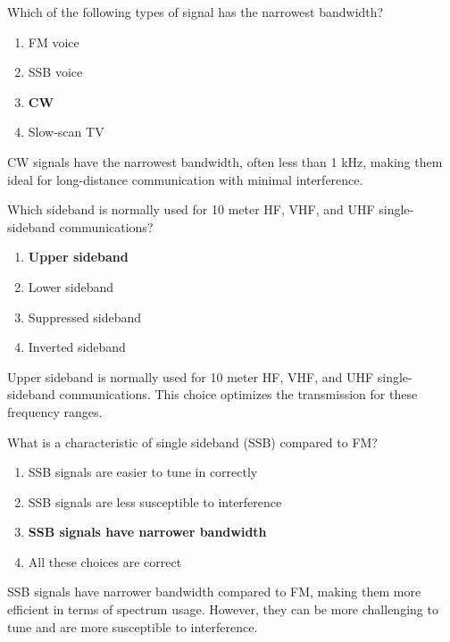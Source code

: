
\begin{tcolorbox}[colback=gray!10!white,colframe=black!75!black,title={T8A05}]
    Which of the following types of signal has the narrowest bandwidth?
    \begin{enumerate}[label=\Alph*),noitemsep]
        \item FM voice
        \item SSB voice
        \item \textbf{CW}
        \item Slow-scan TV
    \end{enumerate}
\end{tcolorbox}
CW signals have the narrowest bandwidth, often less than 1 kHz, making them ideal for long-distance communication with minimal interference.


\begin{tcolorbox}[colback=gray!10!white,colframe=black!75!black,title={T8A06}]
    Which sideband is normally used for 10 meter HF, VHF, and UHF single-sideband communications?
    \begin{enumerate}[label=\Alph*),noitemsep]
        \item \textbf{Upper sideband}
        \item Lower sideband
        \item Suppressed sideband
        \item Inverted sideband
    \end{enumerate}
\end{tcolorbox}
Upper sideband is normally used for 10 meter HF, VHF, and UHF single-sideband communications. This choice optimizes the transmission for these frequency ranges.


\begin{tcolorbox}[colback=gray!10!white,colframe=black!75!black,title={T8A07}]
    What is a characteristic of single sideband (SSB) compared to FM?
    \begin{enumerate}[label=\Alph*),noitemsep]
        \item SSB signals are easier to tune in correctly
        \item SSB signals are less susceptible to interference
        \item \textbf{SSB signals have narrower bandwidth}
        \item All these choices are correct
    \end{enumerate}
\end{tcolorbox}
SSB signals have narrower bandwidth compared to FM, making them more efficient in terms of spectrum usage. However, they can be more challenging to tune and are more susceptible to interference.

